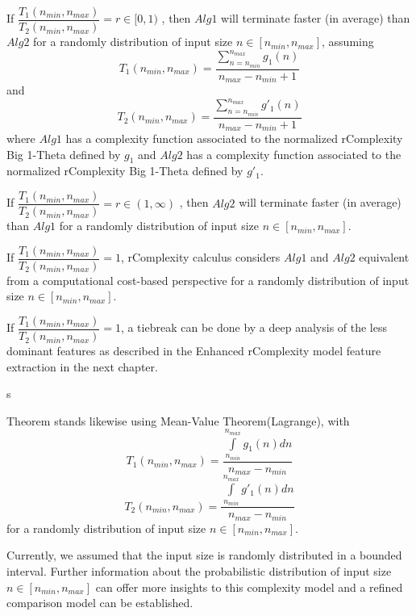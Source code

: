 \begin{theorem}
If $ \dfrac{T_{1}(n_{min}, n_{max})}{T_{2}(n_{min}, n_{max})} = r \in [0,1) $ , then $Alg1$ will terminate faster (in average) than $Alg2$ for a randomly distribution of input size $n \in [n_{min}, n_{max}]$,  assuming \[T_{1}(n_{min}, n_{max}) = \dfrac{\sum\limits_{n=n_{min}}^{n_{max}} g_{1}(n)}{n_{max} - n_{min} + 1}\] and \[T_{2}(n_{min}, n_{max}) = \dfrac{\sum\limits_{n=n_{min}}^{n_{max}} g'_{1}(n)}{n_{max} - n_{min} + 1}\] where $Alg1$ has a complexity function associated to the normalized rComplexity Big 1-Theta defined by $g_{1}$ and $Alg2$ has a complexity function associated to the normalized rComplexity Big 1-Theta defined by $g'_{1}$.
\end{theorem}

\begin{corollary}
If $ \dfrac{T_{1}(n_{min}, n_{max})}{T_{2}(n_{min}, n_{max})} = r \in (1,\infty) $ , then $Alg2$ will terminate faster (in average) than $Alg1$ for a randomly distribution of input size $n \in [n_{min}, n_{max}]$.
\end{corollary}

\begin{remark}
If  $ \dfrac{T_{1}(n_{min}, n_{max})}{T_{2}(n_{min}, n_{max})} = 1$, rComplexity calculus considers $Alg1$ and $Alg2$ equivalent from a computational cost-based perspective for a randomly distribution of input size $n \in [n_{min}, n_{max}]$.
\end{remark}

\begin{remark}
If  $ \dfrac{T_{1}(n_{min}, n_{max})}{T_{2}(n_{min}, n_{max})} = 1$, a tiebreak can be done by a deep analysis of the less dominant features as described in the Enhanced rComplexity model feature extraction in the next chapter.
\end{remark}s

\begin{remark}
Theorem stands likewise using Mean-Value Theorem(Lagrange), with 
\[  T_{1}(n_{min}, n_{max}) = \dfrac{\int\limits_{n_{min}}^{n_{max}} g_{1}(n) dn}{n_{max} - n_{min}}  \]
\[  T_{2}(n_{min}, n_{max}) = \dfrac{\int\limits_{n_{min}}^{n_{max}} g'_{1}(n) dn}{n_{max} - n_{min}}  \]
for a randomly distribution of input size $n \in [n_{min}, n_{max}]$.
\end{remark}

Currently, we assumed that the input size is randomly distributed in a bounded interval. Further information about the probabilistic distribution of input size $n \in [n_{min}, n_{max}]$ can offer more insights to this complexity model and a refined comparison model can be established.

